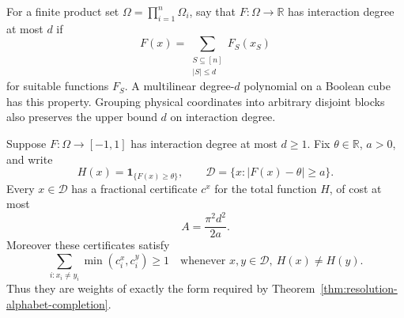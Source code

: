\begin{definition}
\label{ian:alphabet-interaction-degree}
For a finite product set \(\Omega=\prod_{i=1}^n\Omega_i\), say that
\(F:\Omega\to\mathbb R\) has interaction degree at most \(d\) if
\[
 F(x)=\sum_{\substack{S\subseteq[n]\\|S|\le d}}F_S(x_S)
\]
for suitable functions \(F_S\). A multilinear degree-\(d\) polynomial
on a Boolean cube has this property. Grouping physical coordinates
into arbitrary disjoint blocks also preserves the upper bound \(d\)
on interaction degree.
\end{definition}

\begin{lemma}
\label{ian:degree-threshold-certificates}
Suppose \(F:\Omega\to[-1,1]\) has interaction degree at most
\(d\ge1\). Fix \(\theta\in\mathbb R\), \(a>0\), and write
\[
 H(x)=\mathbf1_{\{F(x)\ge\theta\}},\qquad
 \mathcal D=\{x:|F(x)-\theta|\ge a\}.
\]
Every \(x\in\mathcal D\) has a fractional certificate \(c^x\) for
the total function \(H\), of cost at most
\[
 A=\frac{\pi^2d^2}{2a}.
\]
Moreover these certificates satisfy
\[
 \sum_{i:x_i\ne y_i}\min(c_i^x,c_i^y)\ge1
 \quad\text{whenever }x,y\in\mathcal D,\ H(x)\ne H(y).
 \tag{DADV}
\]
Thus they are weights of exactly the form required by
Theorem~\ref{thm:resolution-alphabet-completion}.
\end{lemma}

